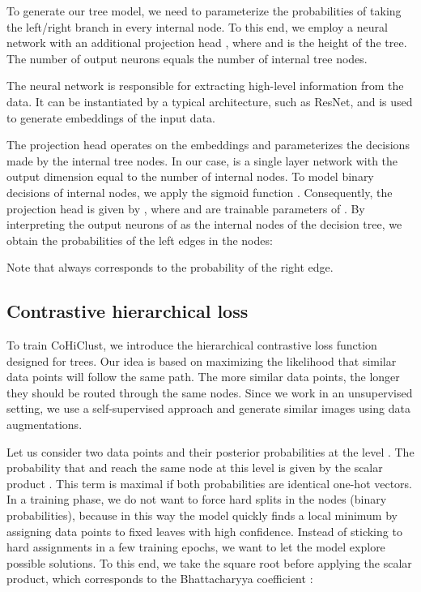 \documentclass[runningheads]{llncs}
\def\our{CoHiClust}
\begin{document}
To generate our tree model, we need to parameterize the probabilities  of taking the left/right branch in every internal node. To this end, we employ a neural network  with an additional projection head , where  and  is the height of the tree. The number  of output neurons equals the number of internal tree nodes.  

The neural network  is responsible for extracting high-level information from the data. It can be instantiated by a typical architecture, such as ResNet, and is used to generate embeddings  of the input data. 

The projection head  operates on the embeddings  and parameterizes the decisions made by the internal tree nodes. In our case,  is a single layer network with the output dimension equal to the number of internal nodes. To model binary decisions of internal nodes, we apply the sigmoid function . Consequently, the projection head is given by , where  and  are trainable parameters of . By interpreting the output neurons of  as the internal nodes of the decision tree, we obtain the probabilities of the left edges in the nodes:

Note that  always corresponds to the probability of the right edge.







\subsection{Contrastive hierarchical loss}

To train \our{}, we introduce the hierarchical contrastive loss function designed for trees. Our idea is based on maximizing the likelihood that similar data points will follow the same path. The more similar data points, the longer they should be routed through the same nodes. Since we work in an unsupervised setting, we use a self-supervised approach and generate similar images using data augmentations.


Let us consider two data points  and their posterior probabilities  at the level . The probability that  and  reach the same node at this level is given by the scalar product . This term is maximal if both probabilities are identical one-hot vectors. 
In a training phase, we do not want to force hard splits in the nodes (binary probabilities), because in this way the model quickly finds a local minimum by assigning data points to fixed leaves with high confidence. Instead of sticking to hard assignments in a few training epochs, we want to let the model explore possible solutions. To this end, we take the square root before applying the scalar product, which corresponds to the Bhattacharyya coefficient \cite{bhattacharyya1946measure}:
\end{document}
